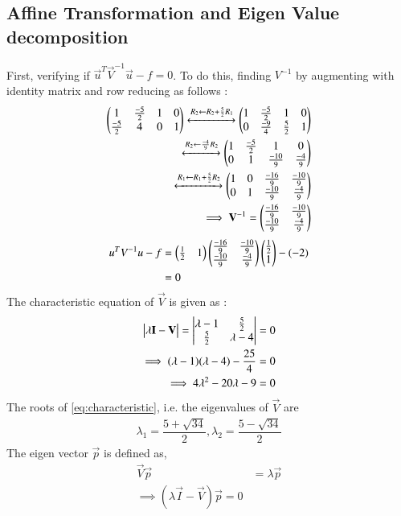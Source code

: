 \documentclass[journal,12pt,twocolumn]{IEEEtran}
\begin{document}
\subsection{Affine Transformation and Eigen Value decomposition}
First, verifying if $\vec{u}^T\vec{V}^{-1}\vec{u}-f = 0$. To do this, finding $V^{-1}$ by augmenting with identity matrix and row reducing as follows :
\begin{align}
    \begin{pmatrix}1 & \frac{-5}{2} & 1 & 0\\ \frac{-5}{2} & 4 & 0 & 1\end{pmatrix}\xleftrightarrow{R_2\leftarrow R_2 + \frac{5}{2}R_1}\begin{pmatrix}1 & \frac{-5}{2} & 1 & 0\\ 0 & \frac{-9}{4} & \frac{5}{2} & 1\end{pmatrix}\\\xleftrightarrow{R_2\leftarrow\frac{-4}{9}R_2}\begin{pmatrix}1 & \frac{-5}{2} & 1 & 0\\ 0 & 1 & \frac{-10}{9} & \frac{-4}{9}\end{pmatrix}\\\xleftrightarrow{R_1\leftarrow R_1 + \frac{5}{2}R_2}\begin{pmatrix}1 & 0 & \frac{-16}{9} & \frac{-10}{9}\\ 0 & 1 & \frac{-10}{9} & \frac{-4}{9}\end{pmatrix}\\
    \implies\mathbf{V}^{-1} = \begin{pmatrix}\frac{-16}{9} & \frac{-10}{9} \\ \frac{-10}{9} & \frac{-4}{9}\end{pmatrix}
\end{align}
\begin{align}
    u^TV^{-1}u-f & = \begin{pmatrix}\frac{1}{2} & 1\end{pmatrix}\begin{pmatrix}\frac{-16}{9} & \frac{-10}{9} \\ \frac{-10}{9} & \frac{-4}{9}\end{pmatrix}\begin{pmatrix}\frac{1}{2} \\ 1\end{pmatrix} - (-2) \\ & = 0
\end{align}
The characteristic equation of $\vec{V}$ is given as :
\begin{align}
    \begin{vmatrix}\lambda\mathbf{I}-\mathbf{V}\end{vmatrix} = \begin{vmatrix}\lambda - 1 & \frac{5}{2} \\ \frac{5}{2} & \lambda - 4\end{vmatrix} = 0\\
    \implies (\lambda - 1)(\lambda - 4) - \dfrac{25}{4} = 0\\
    \label{eq:characteristic}\implies 4\lambda^2-20\lambda-9 = 0
\end{align}
The roots of \eqref{eq:characteristic}, i.e. the eigenvalues of $\vec{V}$ are
\begin{align}
    \lambda_1 = \dfrac{5+\sqrt{34}}{2}, \lambda_2 = \dfrac{5-\sqrt{34}}{2}\label{eq:eigenval}
\end{align}
The eigen vector $\vec{p}$ is defined as, 
\begin{align}
    \vec{V}\vec{p} &= \lambda\vec{p}\\
    \implies(\lambda\vec{I}-\vec{V})\vec{p}=0
\end{align}
\end{document}
